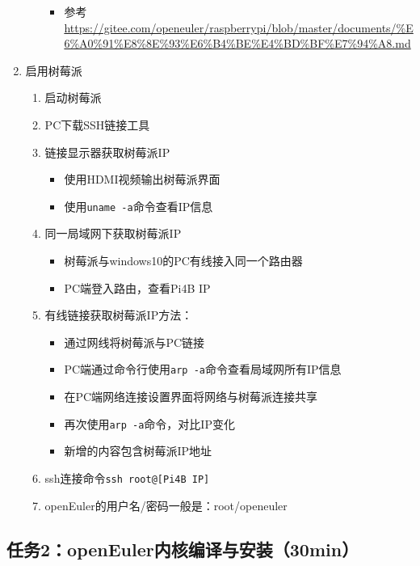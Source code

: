 \documentclass{article}
\begin{document}
\begin{enumerate}
\begin{enumerate}
\begin{itemize}
            \item 参考\url{https://gitee.com/openeuler/raspberrypi/blob/master/documents/%E6%A0%91%E8%8E%93%E6%B4%BE%E4%BD%BF%E7%94%A8.md}
        \end{itemize}
    \end{enumerate}
    \item 启用树莓派
    \begin{enumerate}
        \item 启动树莓派
        \item PC下载SSH链接工具
        \item 链接显示器获取树莓派IP
            \begin{itemize}
            \item 使用HDMI视频输出树莓派界面
            \item 使用\verb|uname -a|命令查看IP信息
            \end{itemize} 
        \item 同一局域网下获取树莓派IP
            \begin{itemize}
            \item 树莓派与windows10的PC有线接入同一个路由器
            \item PC端登入路由，查看Pi4B IP
            \end{itemize}            
        \item 有线链接获取树莓派IP方法：
            \begin{itemize}
            \item 通过网线将树莓派与PC链接
            \item PC端通过命令行使用\verb|arp -a|命令查看局域网所有IP信息
            \item 在PC端网络连接设置界面将网络与树莓派连接共享
            \item 再次使用\verb|arp -a|命令，对比IP变化
            \item 新增的内容包含树莓派IP地址
            \end{itemize}
        \item ssh连接命令\verb|ssh root@[Pi4B IP]|
        \item openEuler的用户名/密码一般是：root/openeuler
    \end{enumerate}
\end{enumerate}

\newpage

\subsection{任务2：openEuler内核编译与安装（30min）}
\end{document}
